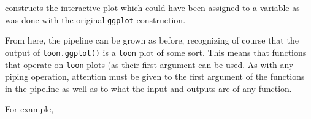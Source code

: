 \documentclass[]{article}
\newenvironment{Shaded}{\begin{snugshade}}{\end{snugshade}}
\newcommand{\KeywordTok}[1]{\textcolor[rgb]{0.13,0.29,0.53}{\textbf{#1}}}
\newcommand{\DataTypeTok}[1]{\textcolor[rgb]{0.13,0.29,0.53}{#1}}
\newcommand{\DecValTok}[1]{\textcolor[rgb]{0.00,0.00,0.81}{#1}}
\newcommand{\FloatTok}[1]{\textcolor[rgb]{0.00,0.00,0.81}{#1}}
\newcommand{\StringTok}[1]{\textcolor[rgb]{0.31,0.60,0.02}{#1}}
\newcommand{\CommentTok}[1]{\textcolor[rgb]{0.56,0.35,0.01}{\textit{#1}}}
\newcommand{\OperatorTok}[1]{\textcolor[rgb]{0.81,0.36,0.00}{\textbf{#1}}}
\newcommand{\NormalTok}[1]{#1}
\begin{document}
\begin{Shaded}
\end{Shaded}

constructs the interactive plot which could have been assigned to a
variable as was done with the original \texttt{ggplot} construction.

From here, the pipeline can be grown as before, recognizing of course
that the output of \texttt{loon.ggplot()} is a \texttt{loon} plot of
some sort. This means that functions that operate on \texttt{loon} plots
(as their first argument can be used. As with any piping operation,
attention must be given to the first argument of the functions in the
pipeline as well as to what the input and outputs are of any function.

For example,
\end{document}
